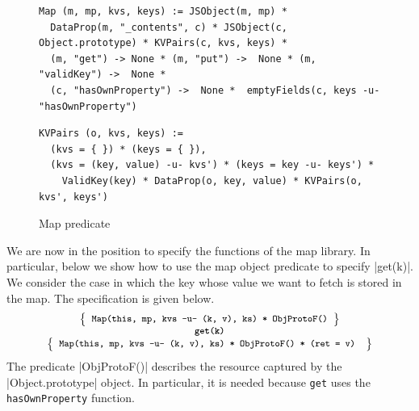 \begin{figure}[t!]
{\scriptsize
 \begin{verbatim}
Map (m, mp, kvs, keys) := JSObject(m, mp) * 
  DataProp(m, "_contents", c) * JSObject(c, Object.prototype) * KVPairs(c, kvs, keys) *
  (m, "get") -> None * (m, "put") ->  None * (m, "validKey") ->  None * 
  (c, "hasOwnProperty") ->  None *  emptyFields(c, keys -u- "hasOwnProperty")
  \end{verbatim}
  \vspace*{-0.3cm}
 \begin{verbatim}
KVPairs (o, kvs, keys) := 
  (kvs = { }) * (keys = { }),
  (kvs = (key, value) -u- kvs') * (keys = key -u- keys') * 
    ValidKey(key) * DataProp(o, key, value) * KVPairs(o, kvs', keys')
\end{verbatim}}
\caption{Map predicate \label{fig:map:example}}
\end{figure}



We are now in the position to specify the functions of the map library. In particular, below we show how to use 
the map object predicate to specify \jsinline|get(k)|.  
%
We consider the case in which the key whose value we  want to fetch is stored in the 
map.  The specification is given below. 
%
\begin{displaymath} 
{\footnotesize
\begin{array}{c}
\left\{ {\begin{array}{c}
 \text{\texttt{Map(this, mp, kvs -u- (k, v), ks) * ObjProtoF()}} \\ 
\end{array}} \right\} \\
%
\text{\bfseries \texttt{get(k)}} \\[0.2mm]
%
\left\{ {\begin{array}{c}
 \text{\texttt{Map(this, mp, kvs -u- (k, v), ks) * ObjProtoF() * (ret = v) }} \\
\end{array}} \right\}
\end{array}
} 
\end{displaymath}
%
The predicate \jsinline|ObjProtoF()| describes the resource captured by the \jsinline|Object.prototype| object. 
In particular, it is needed because \texttt{get} uses the \texttt{hasOwnProperty} function.



